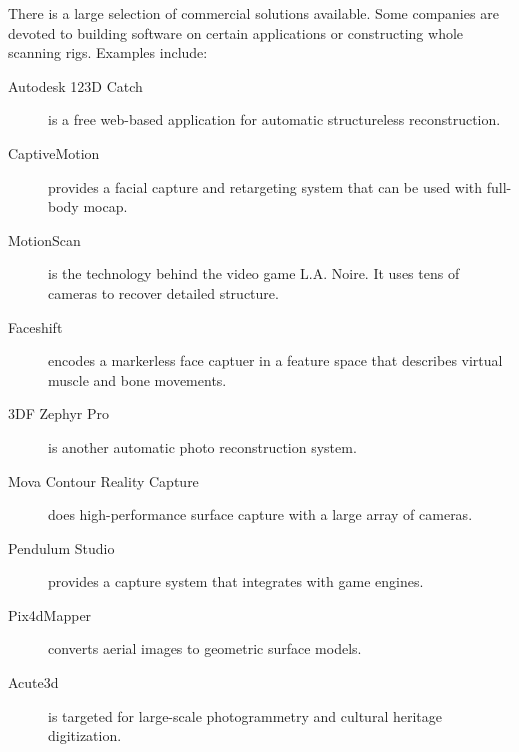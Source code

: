 There is a large selection of commercial solutions available. Some companies are devoted to building software on certain applications or constructing whole scanning rigs. Examples include:
\begin{description}
\item[Autodesk 123D Catch] is a free web-based application for automatic structureless reconstruction.
\item[CaptiveMotion] provides a facial capture and retargeting system that can be used with full-body mocap.
\item[MotionScan] is the technology behind the video game L.A. Noire. \cite{rockstar2011noire} It uses tens of cameras to recover detailed structure.
\item[Faceshift] encodes a markerless face captuer in a feature space that describes virtual muscle and bone movements.
\item[3DF Zephyr Pro] is another automatic photo reconstruction system.
\item[Mova Contour Reality Capture] does high-performance surface capture with a large array of cameras.
\item[Pendulum Studio] provides a capture system that integrates with game engines.
\item[Pix4dMapper] converts aerial images to geometric surface models.
\item[Acute3d] is targeted for large-scale photogrammetry and cultural heritage digitization.
\end{description}
